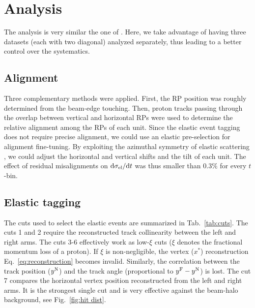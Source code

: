 \documentclass[doublecol]{../macros/epl2}
\def\d{{\rm d}}
\begin{document}
\section{Analysis}

The analysis is very similar the one of \cite{epl96}. Here, we take advantage of having three datasets (each with two diagonal) analyzed separately, thus leading to a better control over the systematics.


\subsection{Alignment}

Three complementary methods were applied. First, the RP position was roughly determined from the beam-edge touching. Then, proton tracks passing through the overlap between vertical and horizontal RPs were used to determine the relative alignment among the RPs of each unit. Since the elastic event tagging does not require precise alignment, we could use an elastic pre-selection for alignment fine-tuning. By exploiting the azimuthal symmetry of elastic scattering%
, we could adjust the horizontal and vertical shifts and the tilt of each unit. The effect of residual misalignments on $\d\sigma_{\rm el}/\d t$ was thus smaller than $0.3\%$ for every $t$-bin.


\subsection{Elastic tagging}

The cuts used to select the elastic events are summarized in Tab.~\ref{tab:cuts}. The cuts 1 and 2 require the reconstructed track collinearity between the left and right arms. The cuts 3-6 effectively work as low-$\xi$ cuts ($\xi$ denotes the fractional momentum loss of a proton). If $\xi$ is non-negligible, the vertex ($x^*$) reconstruction Eq.~\ref{eq:reconstruction} becomes invalid. Similarly, the correlation between the track position ($y^{\rm N}$) and the track angle (proportional to $y^{\rm F} - y^{\rm N}$) is lost. The cut 7 compares the horizontal vertex position reconstructed from the left and right arms. It is the strongest single cut and is very effective against the beam-halo background, see Fig.~\ref{fig:hit dist}.
\end{document}
